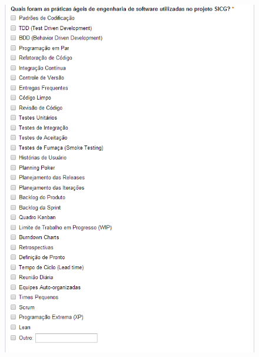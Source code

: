 \begin{apendicesenv}
\begin{figure}[H]
		\centering
			\includegraphics[scale=1.0]{figuras/quest5.png}

		\label{quest5}
\end{figure}


\end{apendicesenv}
